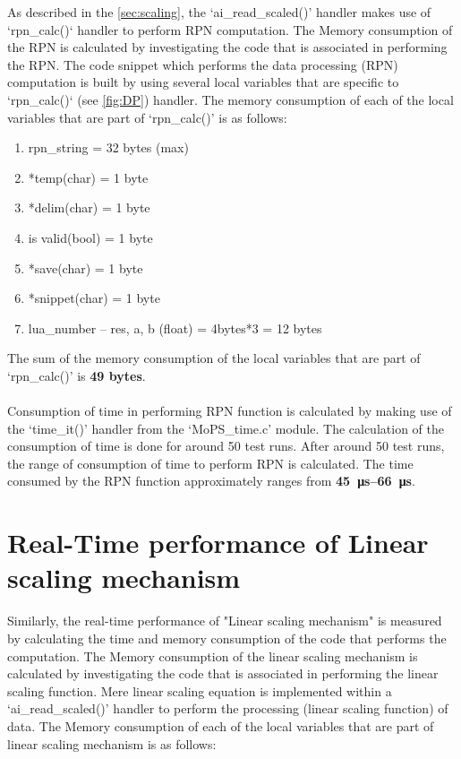 As described in the \cref{sec:scaling}, the `ai\_read\_scaled()' handler makes use of `rpn\_calc()` handler to perform RPN computation. The Memory consumption of the RPN is calculated by investigating the code that is associated in performing the RPN. The code snippet which performs the data processing (RPN) computation is built by using several local variables that are specific to `rpn\_calc()` (see \cref{fig:DP}) handler. The memory consumption of each of the local variables that are part of `rpn\_calc()' is as follows:  
\begin{enumerate}
\item rpn\_string = 32 bytes (max)
\item *temp(char) = 1 byte
\item *delim(char) = 1 byte
\item is valid(bool) = 1 byte
\item *save(char) = 1 byte
\item *snippet(char) = 1 byte
\item lua\_number -- res, a, b (float) = 4bytes*3 = 12 bytes
\end{enumerate}
The sum of the memory consumption of the local variables that are part of `rpn\_calc()' is \textbf{49 bytes}.
\\
\\
Consumption of time in performing RPN function is calculated by making use of the `time\_it()' handler from the `MoPS\_time.c' module. The calculation of the consumption of time is done for around 50 test runs. After around 50 test runs, the range of consumption of time to perform RPN is calculated. The time consumed by the RPN function approximately ranges from \textbf{\SIrange{45}{66}{\micro\second}}.

\section*{Real-Time performance of Linear scaling mechanism}

Similarly, the real-time performance of "Linear scaling mechanism" is measured by calculating the time and memory consumption of the code that performs the computation. 
The Memory consumption of the linear scaling mechanism is calculated by investigating the code that is associated in performing the linear scaling function.
Mere linear scaling equation is implemented within a `ai\_read\_scaled()' handler to perform the processing (linear scaling function) of data. 
The Memory consumption of each of the local variables that are part of linear scaling mechanism is as follows:

